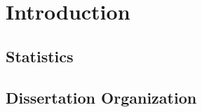 \chapter{Introduction} \label{chap-intro}


\section{Statistics}
\Blindtext

\section{Dissertation Organization}
\Blindtext